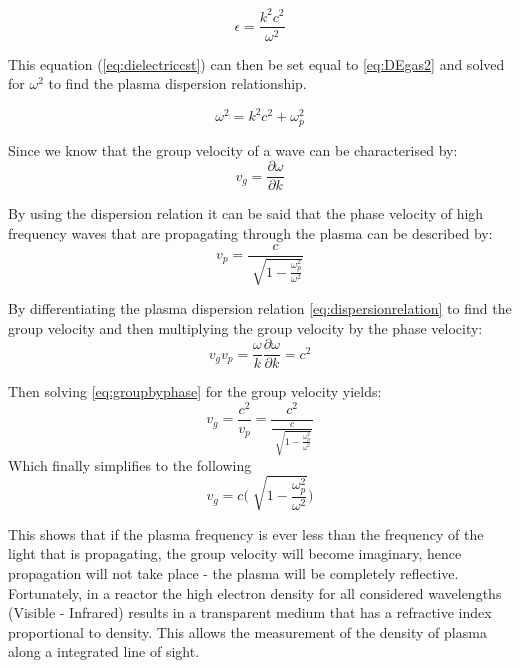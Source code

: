\documentclass[12pt,a4paper,oneside]{report}
\begin{document}
\begin{equation}
\epsilon = \frac{k^{2}c^{2}}{\omega ^{2}}
	\label{eq:dielectriccst}
\end{equation}

This equation (\ref{eq:dielectriccst}) can then be set equal to \ref{eq:DEgas2} and solved for $\omega ^{2}$ to find the plasma dispersion relationship.

\begin{equation}
\omega ^{2} = k^{2}c^{2} + \omega _{p}^{2}
	\label{eq:dispersionrelation}
\end{equation}

Since we know that the group velocity of a wave can be characterised by:
\begin{equation}
v_{g} = \frac{\partial \omega}{\partial k}
	\label{eq:groupvelocity}
\end{equation}

By using the dispersion relation it can be said that the phase velocity of high frequency waves that are propagating through the plasma can be described by:
\begin{equation}
v_{p} = \frac{c}{\sqrt[]{1-\frac{\omega _{p}^{2}}{\omega ^{2}}}}
	\label{eq:highfreqprop}
\end{equation}

By differentiating the plasma dispersion relation \ref{eq:dispersionrelation} to find the group velocity and then multiplying the group velocity by the phase velocity:
\begin{equation}
v_{g} v_{p} = \frac{\omega}{k} \frac{\partial \omega}{\partial k} = c^{2}
	\label{eq:groupbyphase}
\end{equation}

Then solving \ref{eq:groupbyphase} for the group velocity yields:
\begin{equation}
v_{g} = \frac{c^{2}}{v_{p}} = \frac{c^{2}}{\frac{c}{\sqrt[]{1-\frac{\omega _{p}^{2}}{\omega ^{2}}}}}
	\label{eq:groupvelocityplasma1}
\end{equation}
Which finally simplifies to the following
\begin{equation}
v_{g} = c \Big(\sqrt[]{1-\frac{\omega _{p}^{2}}{\omega ^{2}}} \Big)
	\label{eq:groupvelocityplasma2}
\end{equation}

This shows that if the plasma frequency is ever less than the frequency of the light that is propagating, the group velocity will become imaginary, hence propagation will not take place - the plasma will be completely reflective. Fortunately, in a reactor the high electron density for all considered wavelengths (Visible - Infrared) results in a transparent medium that has a refractive index proportional to density. This allows the measurement of the density of plasma along a integrated line of sight.\\
\end{document}

